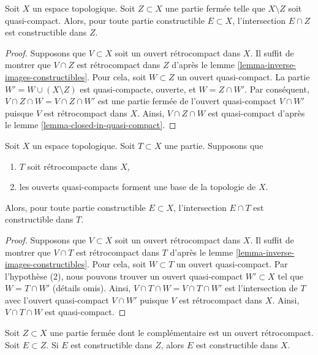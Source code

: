 \begin{lemma}
\label{lemma-intersect-constructible-with-closed}
Soit $X$ un espace topologique. Soit $Z \subset X$ une partie fermée
telle que $X \setminus Z$ soit quasi-compact.
Alors, pour toute partie constructible $E \subset X$, l'intersection
$E \cap Z$ est constructible dans $Z$.
\end{lemma}

\begin{proof}
Supposons que $V \subset X$ soit un ouvert rétrocompact dans $X$.
Il suffit de montrer que $V \cap Z$ est rétrocompact dans $Z$
d'après le lemme \ref{lemma-inverse-images-constructibles}. Pour cela,
soit $W \subset Z$ un ouvert quasi-compact. La partie
$W' = W \cup (X \setminus Z)$ est quasi-compacte, ouverte, et $W = Z \cap W'$.
Par conséquent, $V \cap Z \cap W = V \cap Z \cap W'$
est une partie fermée de l'ouvert quasi-compact $V \cap W'$
puisque $V$ est rétrocompact dans $X$. Ainsi, $V \cap Z \cap W$ est quasi-compact
d'après le lemme \ref{lemma-closed-in-quasi-compact}.
\end{proof}

\begin{lemma}
\label{lemma-intersect-constructible-with-retrocompact}
Soit $X$ un espace topologique. Soit $T \subset X$ une partie. Supposons que
\begin{enumerate}
\item $T$ soit rétrocompacte dans $X$,
\item les ouverts quasi-compacts forment une base de la topologie de $X$.
\end{enumerate}
Alors, pour toute partie constructible $E \subset X$, l'intersection $E \cap T$ est
constructible dans $T$.
\end{lemma}

\begin{proof}
Supposons que $V \subset X$ soit un ouvert rétrocompact dans $X$.
Il suffit de montrer que $V \cap T$ est rétrocompact dans $T$
d'après le lemme \ref{lemma-inverse-images-constructibles}. Pour cela,
soit $W \subset T$ un ouvert quasi-compact. Par l'hypothèse (2),
nous pouvons trouver un ouvert quasi-compact $W' \subset X$
tel que $W = T \cap W'$ (détails omis).
Ainsi, $V \cap T \cap W = V \cap T \cap W'$
est l'intersection de $T$ avec  l'ouvert quasi-compact $V \cap W'$
puisque $V$ est rétrocompact dans $X$. Ainsi, $V \cap T \cap W$ est quasi-compact.
\end{proof}

\begin{lemma}
\label{lemma-closed-constructible-image}
Soit $Z \subset X$ une partie fermée dont le complémentaire est un ouvert rétrocompact.
Soit $E \subset Z$. Si $E$ est constructible dans $Z$, alors $E$ est constructible
dans $X$.
\end{lemma}

